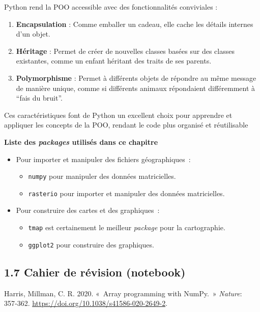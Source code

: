 \documentclass[
]{article}
\newlength{\cslhangindent}
\newenvironment{CSLReferences}[2] %
 {\begin{list}{}{%
  \setlength{\itemindent}{0pt}
  \setlength{\leftmargin}{0pt}
  \setlength{\parsep}{0pt}
  \ifodd #1
   \setlength{\leftmargin}{\cslhangindent}
   \setlength{\itemindent}{-1\cslhangindent}
  \fi
  \setlength{\itemsep}{#2\baselineskip}}}
 {\end{list}}
\providecommand{\tightlist}{%
  \setlength{\itemsep}{0pt}\setlength{\parskip}{0pt}}
\begin{document}
Python rend la POO accessible avec des fonctionnalités conviviales :

\begin{enumerate}
\def\labelenumi{\arabic{enumi}.}
\item
  \textbf{Encapsulation} : Comme emballer un cadeau, elle cache les
  détails internes d'un objet.
\item
  \textbf{Héritage} : Permet de créer de nouvelles classes basées sur
  des classes existantes, comme un enfant héritant des traits de ses
  parents.
\item
  \textbf{Polymorphisme} : Permet à différents objets de répondre au
  même message de manière unique, comme si différents animaux
  répondaient différemment à ``fais du bruit''.
\end{enumerate}

Ces caractéristiques font de Python un excellent choix pour apprendre et
appliquer les concepts de la POO, rendant le code plus organisé et
réutilisable

\textbf{Liste des \emph{packages} utilisés dans ce chapitre}

\begin{itemize}
\tightlist
\item
  Pour importer et manipuler des fichiers géographiques~:

  \begin{itemize}
  \tightlist
  \item
    \texttt{numpy} pour manipuler des données matricielles.
  \item
    \texttt{rasterio} pour importer et manipuler des données
    matricielles.
  \end{itemize}
\item
  Pour construire des cartes et des graphiques~:

  \begin{itemize}
  \tightlist
  \item
    \texttt{tmap} est certainement le meilleur \emph{package} pour la
    cartographie.
  \item
    \texttt{ggplot2} pour construire des graphiques.
  \end{itemize}
\end{itemize}

\label{sec-016}
\subsection{\texorpdfstring{{1.7} Cahier de révision
(notebook)}{1.7 Cahier de révision (notebook)}}\label{cahier-de-ruxe9vision-notebook}

\label{refs}
\begin{CSLReferences}{1}{0}
Harris, Millman, C. R. 2020. {«~Array programming with NumPy.~»}
\emph{{Nature}}: 357‑362.
\url{https://doi.org/10.1038/s41586-020-2649-2}.

\end{CSLReferences}
\end{document}
